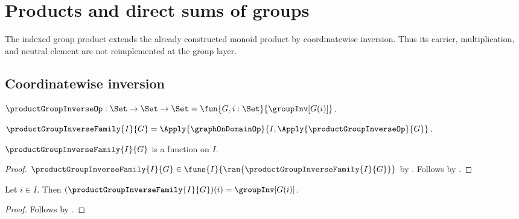 







\section{Products and direct sums of groups}

The indexed group product extends the already constructed monoid product by
coordinatewise inversion.  Thus its carrier, multiplication, and neutral
element are not reimplemented at the group layer.

\subsection{Coordinatewise inversion}

\begin{definition}\label{product_group_inverse_op}
    $\productGroupInverseOp:\Set\to\Set\to\Set
        =\fun{G,i:\Set}{\groupInv[G(i)]}$.
\end{definition}

\begin{definition}\label{product_group_inverse_family}
    $\productGroupInverseFamily{I}{G}
        =\Apply{\graphOnDomainOp}{
            I,\Apply{\productGroupInverseOp}{G}}$.
\end{definition}

\begin{proposition}\label{product_group_inverse_family_type}
    $\productGroupInverseFamily{I}{G}$ is a function on $I$.
\end{proposition}
\begin{proof}
    $\productGroupInverseFamily{I}{G}\in
        \funs{I}{\ran{\productGroupInverseFamily{I}{G}}}$ by
        .
    Follows by .
\end{proof}

\begin{proposition}\label{product_group_inverse_family_apply}
    Let $i\in I$.
    Then $(\productGroupInverseFamily{I}{G})(i)=\groupInv[G(i)]$.
\end{proposition}
\begin{proof}
    Follows by
        .
\end{proof}

